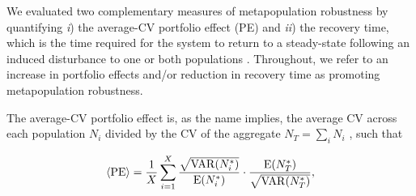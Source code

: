 \documentclass{revtex4}
\begin{document}


\noindent We evaluated two complementary measures of metapopulation robustness by quantifying \emph{i}) the average-CV portfolio effect (PE) \citep{Anderson:2014cx,Schindler:2015gf} and \emph{ii}) the recovery time, which is the time required for the system to return to a steady-state following an induced disturbance to one or both populations \citep{Ovaskainen:2002il}.
Throughout, we refer to an increase in portfolio effects and/or reduction in recovery time as promoting metapopulation robustness.

The average-CV portfolio effect is, as the name implies, the average CV across each population $N_i$ divided by the CV of the aggregate $N_T=\sum_i N_i$ \citep{Anderson:2013gb}, such that

\begin{equation}
\langle{\rm PE}\rangle =\frac{1}{X}\sum_{i=1}^{X} \frac{\sqrt{{\rm VAR}(N_i^*)}}{{\rm E}(N_i^*)}\cdot \frac{{\rm E}(N_T^*)}{\sqrt{{\rm VAR}(N_T^*)}},
\label{eq:pe}
\end{equation}
\end{document}
